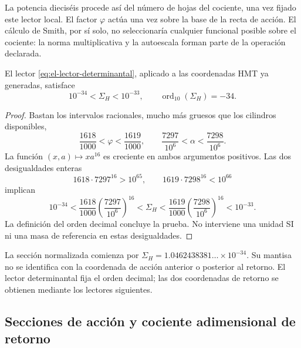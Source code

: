 La potencia dieciséis procede así del número de hojas del cociente, una
vez fijado este lector local. El factor \(\varphi\) actúa una vez sobre
la base de la recta de acción. El cálculo de Smith, por sí solo, no
seleccionaría cualquier funcional posible sobre el cociente: la norma
multiplicativa y la autoescala forman parte de la operación declarada.

\begin{theorem}
El lector \eqref{eq:el-lector-determinantal}, aplicado a las coordenadas
HMT ya generadas, satisface
\begin{equation}
 10^{-34}<\Sigma_H<10^{-33},\qquad
 \operatorname{ord}_{10}(\Sigma_H)=-34.
 \label{eq:el-decada}
\end{equation}
\end{theorem}
\begin{proof}
Bastan los intervalos racionales, mucho más gruesos que los cilindros
disponibles,
\[
 \frac{1618}{1000}<\varphi<\frac{1619}{1000},\qquad
 \frac{7297}{10^6}<\alpha<\frac{7298}{10^6}.
\]
La función \((x,a)\mapsto xa^{16}\) es creciente en ambos argumentos
positivos. Las dos desigualdades enteras
\[
 1618\cdot7297^{16}>10^{65},\qquad
 1619\cdot7298^{16}<10^{66}
\]
implican
\[
 10^{-34}
 <\frac{1618}{1000}\left(\frac{7297}{10^6}\right)^{16}
 <\Sigma_H
 <\frac{1619}{1000}\left(\frac{7298}{10^6}\right)^{16}
 <10^{-33}.
\]
La definición del orden decimal concluye la prueba. No interviene una
unidad SI ni una masa de referencia en estas desigualdades.
\end{proof}

La sección normalizada comienza por
\(\Sigma_H=1.0462438381\ldots\times10^{-34}\). Su mantisa no se
identifica con la coordenada de acción anterior o posterior al retorno.
El lector determinantal fija el orden decimal; las dos coordenadas de
retorno se obtienen mediante los lectores siguientes.


\subsection{Secciones de acción y cociente adimensional de retorno}


